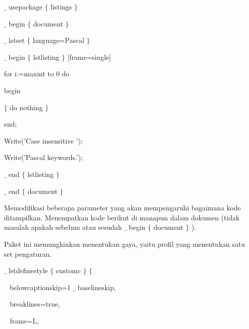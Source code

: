 \noindent  $ \_ $ usepackage $ \{ $ listings $ \} $ ~~~~~~~~~~~~ \par


\noindent  $ \_ $ begin $ \{ $ document $ \} $ \par


\noindent  $ \_ $ lstset $ \{ $ language=Pascal $ \} $ ~~~~~~~ \par


\noindent  $ \_ $ begin $ \{ $ lstlisting $ \} $ [frame=single]~ \par


\noindent for i:=maxint to 0 do\par


\noindent begin\par


\noindent  $ \{ $  do nothing  $ \} $ \par


\noindent end;\par


\noindent Write('Case insensitive ');\par


\noindent Write('Pascal keywords.');\par


\noindent  $ \_ $ end $ \{ $ lstlisting $ \} $ \par


\noindent 
\vspace{12pt}
\noindent  $ \_ $ end $ \{ $ document $ \} $ \par


\hspace{0.50in} Memodifikasi beberapa parameter yang akan mempengaruhi bagaimana kode ditampilkan. Menempatkan kode berikut di manapun dalam dokumen (tidak masalah apakah sebelum atau sesudah  $ \_ $  begin  $ \{ $ document $ \} $ ). \par
\hspace{0.50in} Paket ini memungkinkan menentukan gaya, yaitu profil yang menentukan satu set pengaturan. \par
 $ \_ $ lstdefinestyle $ \{ $ customc $ \} $  $ \{ $ \par

{\fontsize{10pt}{10pt}\selectfont ~ belowcaptionskip=1 $ \_ $ baselineskip,}\par

{\fontsize{10pt}{10pt}\selectfont ~ breaklines=true,}\par

{\fontsize{10pt}{10pt}\selectfont ~ frame=L,}\par

